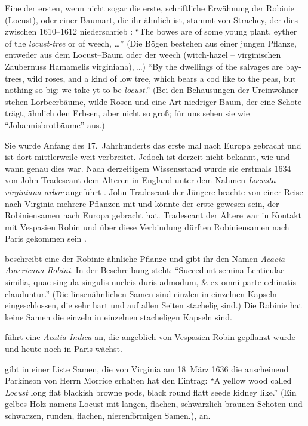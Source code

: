 \documentclass[twocolumn]{scrartcl}
\begin{document}
Eine der ersten, wenn nicht sogar die erste, schriftliche Erwähnung der Robinie
(Locust), oder einer Baumart, die ihr ähnlich ist, stammt von Strachey, der dies
zwischen 1610--1612 niederschrieb \citep{strachey1610-1612historie}:
\enquote{The bowes are of some young plant, eyther of the \emph{locust-tree} or
of weech, \dots} (Die Bögen bestehen aus einer jungen Pflanze, entweder aus dem
Locust--Baum oder der weech (witch-hazel -- virginischen Zaubernuss Hamamelis
virginiana), \dots) \enquote{By the dwellings of the salvages are bay-trees,
wild roses, and a kind of low tree, which bears a cod like to the peas, but
nothing so big: we take yt to be \emph{locust}.} (Bei den Behausungen der
Ureinwohner stehen Lorbeerbäume, wilde Rosen und eine Art niedriger Baum, der
eine Schote trägt, ähnlich den Erbsen, aber nicht so groß; für uns sehen sie wie
\enquote{Johannisbrotbäume} aus.)

Sie wurde Anfang des 17.~Jahrhunderts das erste mal nach Europa gebracht und ist
dort mittlerweile weit verbreitet. Jedoch ist derzeit nicht bekannt, wie und
wann genau dies war. Nach derzeitigem Wissensstand wurde sie erstmals 1634 von
John Tradescant dem Älteren in England unter dem Nahmen \emph{Locusta virginiana
arbor} angeführt \citep[S.~339]{gunther1922botanists}. John Tradescant der
Jüngere brachte von einer Reise nach Virginia mehrere Pflanzen mit und könnte
der erste gewesen sein, der Robiniensamen nach Europa gebracht hat. Tradescant
der Ältere war in Kontakt mit Vespasien Robin und über diese Verbindung dürften
Robiniensamen nach Paris gekommen sein \citep{bouteiller2019robinie}.

\citet[S.~171--173]{cornuti1635robinie} beschreibt eine der Robinie
ähnliche Pflanze und gibt ihr den Namen \emph{Acacia Americana
Robini}. In der Beschreibung steht: \enquote{Succedunt semina Lenticulae
similia, quae singula singulis nucleis duris admodum, \& ex omni parte
echinatis clauduntur.} (Die linsenähnlichen Samen sind einzlen in
einzelnen Kapseln eingeschlossen, die sehr hart und auf allen Seiten
stachelig sind.) Die Robinie hat keine Samen die einzeln in einzelnen
stacheligen Kapseln sind.

\citet[S.~28]{deLaBrosse1636robinie} führt eine \emph{Acatia Indica}
an, die angeblich von Vespasien Robin gepflanzt wurde und heute noch
in Paris wächst.

\citet[S.~370]{gunther1922botanists} gibt in einer Liste Samen, die
von Virginia am 18~März 1636 die anscheinend Parkinson von Herrn
Morrice erhalten hat den Eintrag: \enquote{A yellow wood called
\emph{Locust} long flat blackish browne pods, black round flatt seede
kidney like.} (Ein gelbes Holz namens Locust mit langen, flachen,
schwärzlich-braunen Schoten und schwarzen, runden, flachen,
nierenförmigen Samen.), an.
\end{document}
